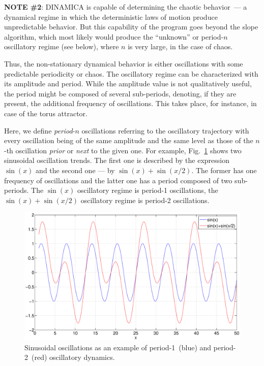 \documentclass[11pt,a4paper]{article}
\begin{document}
\textbf{NOTE \#2}: DINAMICA is capable of determining the chaotic behavior~--- a
dynamical regime in which the deterministic laws of motion produce unpredictable
behavior. But this capability of the program goes beyond the slope algorithm, which
most likely would produce the ``unknown'' or period-$n$ oscillatory regime (see
below), where $n$ is very large, in the case of chaos.

Thus, the non-stationary dynamical behavior is either oscillations with some
predictable periodicity or chaos. The oscillatory regime can be characterized with
its amplitude and period. While the amplitude value is not qualitatively useful, the
period might be composed of several sub-periods, denoting, if they are present, the
additional frequency of oscillations. This takes place, for instance, in case of the
torus attractor.

Here, we define \textit{period}-$n$ oscillations referring to the oscillatory
trajectory with every oscillation being of the same amplitude and the same level as
those of the $n$-th oscillation \textit{prior} or \textit{next} to the given one. For
example, Fig.~\ref{fig:3} shows two sinusoidal oscillation trends. The first one is
described by the expression $\sin(x)$ and the second one --- by
$\sin(x)+\sin(x/2)$. The former has one frequency of oscillations and the latter one
has a period composed of two sub-periods. The $\sin(x)$ oscillatory regime is
period-1 oscillations, the $\sin(x)+\sin(x/2)$ oscillatory regime is period-2
oscillations.

\begin{figure}
  \centering
  \includegraphics[scale=0.3]{period-n}
  \caption{Sinusoidal oscillations as an example of period-1~(blue) and
    period-2~(red) oscillatory dynamics.}
  \label{fig:3}
\end{figure}
\end{document}
